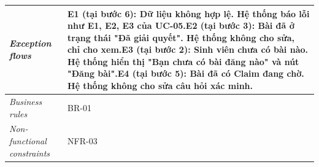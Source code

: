 \begin{longtable}[]{@{}|>{\raggedright\arraybackslash}p{}|>{\raggedright\arraybackslash}p{}|@{}}
\emph{Exception flows} & E1 (tại bước 6): Dữ liệu không hợp lệ. Hệ thống báo lỗi như E1, E2, E3 của UC-05.\newline E2 (tại bước 3): Bài đã ở trạng thái "Đã giải quyết". Hệ thống không cho sửa, chỉ cho xem.\newline E3 (tại bước 2): Sinh viên chưa có bài nào. Hệ thống hiển thị "Bạn chưa có bài đăng nào" và nút "Đăng bài".\newline E4 (tại bước 5): Bài đã có Claim đang chờ. Hệ thống không cho sửa câu hỏi xác minh. \\ \hline
\emph{Business rules} & BR-01 \\ \hline
\emph{Non-functional constraints} & NFR-03 \\ \hline
\end{longtable}
